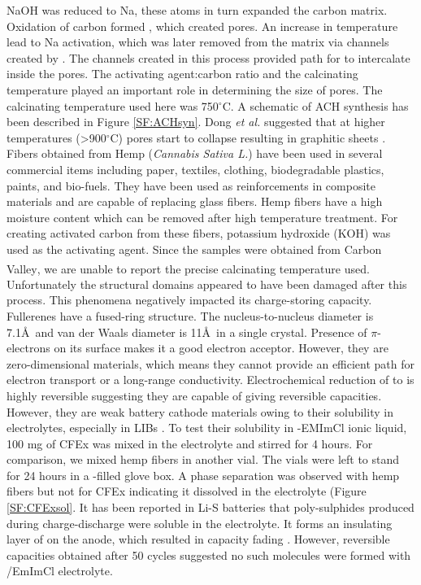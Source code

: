 \documentclass{article}
\begin{document}
NaOH was reduced to Na, these atoms in turn expanded the carbon matrix. Oxidation of carbon formed , which created pores. An increase in temperature lead to Na activation, which was later removed from the matrix via channels created by . The channels created in this process provided path for  to intercalate inside the pores. The activating agent:carbon ratio and the calcinating temperature played an important role in determining the size of pores. The calcinating temperature used here was 750$^{\circ}$C. A schematic of ACH synthesis has been described in Figure \ref{SF:ACHsyn}. Dong \textit{et al.} suggested that at higher temperatures (>900$^{\circ}$C) pores start to collapse resulting in graphitic sheets \cite{dong_commercial_2019}. 
Fibers obtained from Hemp (\textit{Cannabis Sativa L.}) have been used in several commercial items including paper, textiles, clothing, biodegradable plastics, paints, and bio-fuels. They have been used as reinforcements in composite materials and are capable of replacing glass fibers. Hemp fibers have a high moisture content which can be removed after high temperature treatment\cite{hussain_development_2019}. For creating activated carbon from these fibers, potassium hydroxide (KOH) was used as the activating agent. Since the samples were obtained from Carbon Valley\textsuperscript{\textregistered}, we are unable to report the precise calcinating temperature used. Unfortunately the structural domains appeared to have been damaged after this process. This phenomena negatively impacted its charge-storing capacity.  
Fullerenes have a fused-ring structure. The nucleus-to-nucleus diameter is 7.1\AA\ and van der Waals diameter is 11\AA\ in a single crystal. Presence of $\pi$-electrons on its surface makes it a good electron acceptor. However, they are zero-dimensional materials, which means they cannot provide an efficient path for electron transport or a long-range conductivity\cite{loutfy_fullerene_2002, winkler_two-component_2007}. Electrochemical reduction of  to  is highly reversible suggesting they are capable of giving reversible capacities. However, they are weak battery cathode materials owing to their solubility in electrolytes, especially in LIBs \cite{seger_prospects_1991}. To test their solubility in -EMImCl ionic liquid, 100 mg of CFEx was mixed in the electrolyte and stirred for 4 hours. For comparison, we mixed hemp fibers in another vial. The vials were left to stand for 24 hours in a -filled glove box. A phase separation was observed with hemp fibers but not for CFEx indicating it dissolved in the electrolyte (Figure \ref{SF:CFExsol}. It has been reported in Li-S batteries that poly-sulphides produced during charge-discharge were soluble in the electrolyte. It forms an insulating layer of  on the anode, which resulted in capacity fading \cite{sun_effect_2017, yan_2d_nodate}. However, reversible capacities obtained after 50 cycles suggested no such molecules were formed with /EmImCl electrolyte. 
\end{document}
